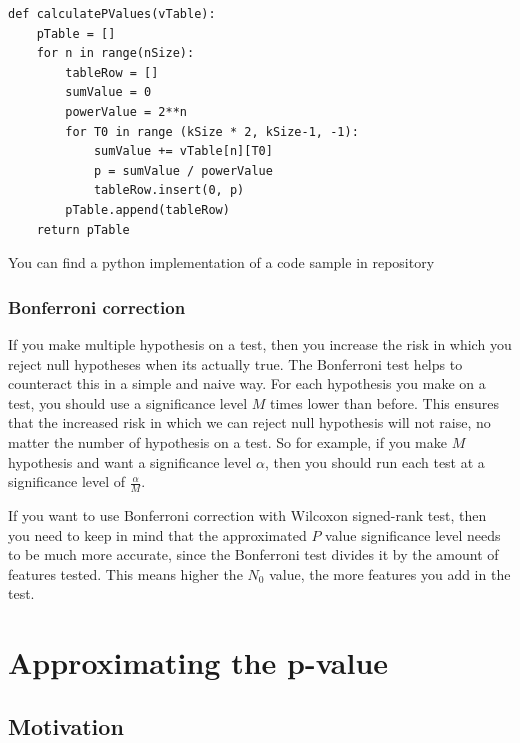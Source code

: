 \documentclass[12pt]{article}
\begin{document}
{\begin{lstlisting}
def calculatePValues(vTable):
    pTable = []
    for n in range(nSize):
        tableRow = []
        sumValue = 0
        powerValue = 2**n
        for T0 in range (kSize * 2, kSize-1, -1):
            sumValue += vTable[n][T0]
            p = sumValue / powerValue
            tableRow.insert(0, p)
        pTable.append(tableRow)
    return pTable

\end{lstlisting}

You can find a python implementation of a code sample in repository ~\cite{stenver_repo_p_accurate_table_py}

\subsubsection{Bonferroni correction}

If you make multiple hypothesis on a test, then you increase the risk in which you reject null hypotheses when its actually true. The Bonferroni test helps to counteract this in a simple and naive way. For each hypothesis you make on a test, you should use a significance level $M$ times lower than before. This ensures that the increased risk in which we can reject null hypothesis will not raise, no matter the number of hypothesis on a test. So for example, if you make $M$ hypothesis and want a significance level $\alpha$,  then you should run each test at a significance level of $\frac{\alpha}{M}$.

If you want to use Bonferroni correction with Wilcoxon signed-rank test, then you need to keep in mind that the approximated $P$ value significance level needs to be much more accurate, since the Bonferroni test divides it by the amount of features tested. This means higher the $N_0$ value, the more features you add in the test.

\newpage

\section{Approximating the p-value}
\label{sec:approximating_p_value}

\subsection{Motivation}

}
\end{document}
